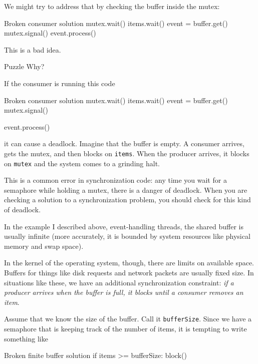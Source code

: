 We might try to address that by checking the buffer inside the
mutex:

\begin{lstbox}{Broken consumer solution}
mutex.wait()
    items.wait()
    event = buffer.get()
mutex.signal()
event.process()
\end{lstbox}

This is a bad idea.

\begin{puzzlebox}{Puzzle}
Why?
\end{puzzlebox}


If the consumer is running this code

\begin{lstbox}{Broken consumer solution}
mutex.wait()
    items.wait()
    event = buffer.get()
mutex.signal()

event.process()
\end{lstbox}
%
it can cause a deadlock.  Imagine that the buffer is empty.
A consumer arrives, gets the mutex, and then blocks on
{\tt items}.  When the producer arrives, it blocks on
{\tt mutex} and the system comes to a grinding halt.

This is a common error in synchronization code: any time
you wait for a semaphore while holding a mutex, there is
a danger of deadlock.  When you are checking a solution to
a synchronization problem, you should check for this kind
of deadlock.

\newpage
{}

In the example I described above, event-handling threads,
the shared buffer is usually infinite (more accurately, it is
bounded by system resources like physical memory and swap
space).

In the kernel of the operating system, though, there are
limits on available space.  Buffers for things like disk
requests and network packets are usually fixed size.  In
situations like these, we have an additional synchronization
constraint: \emph{if a producer arrives when the buffer is full, it
blocks until a consumer removes an item}.


Assume that we know the size of the buffer.  Call it
{\tt bufferSize}.  Since we have a semaphore that is keeping
track of the number of items, it is tempting to write something
like 

\begin{lstbox}{Broken finite buffer solution}
if items >= bufferSize:
    block()
\end{lstbox}

